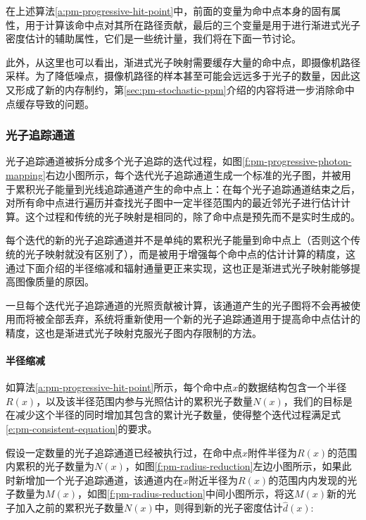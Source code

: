 在上述算法\ref{a:pm-progressive-hit-point}中，前面的变量为命中点本身的固有属性，用于计算该命中点对其所在路径贡献，最后的三个变量是用于进行渐进式光子密度估计的辅助属性，它们是一些统计量，我们将在下面一节讨论。

此外，从这里也可以看出，渐进式光子映射需要缓存大量的命中点，即摄像机路径采样。为了降低噪点，摄像机路径的样本甚至可能会远远多于光子的数量，因此这又形成了新的内存制约，第\ref{sec:pm-stochastic-ppm}介绍的内容将进一步消除命中点缓存导致的问题。






\subsubsection{光子追踪通道}
光子追踪通道被拆分成多个光子追踪的迭代过程，如图\ref{f:pm-progressive-photon-mapping}右边小图所示，每个迭代光子追踪通道生成一个标准的光子图，并被用于累积光子能量到光线追踪通道产生的命中点上：在每个光子追踪通道结束之后，对所有命中点进行遍历并查找光子图中一定半径范围内的最近邻光子进行估计计算。这个过程和传统的光子映射是相同的，除了命中点是预先而不是实时生成的。

每个迭代的新的光子追踪通道并不是单纯的累积光子能量到命中点上（否则这个传统的光子映射就没有区别了），而是被用于增强每个命中点的估计计算的精度，这通过下面介绍的半径缩减和辐射通量更正来实现，这也正是渐进式光子映射能够提高图像质量的原因。

一旦每个迭代光子追踪通道的光照贡献被计算，该通道产生的光子图将不会再被使用而将被全部丢弃，系统将重新使用一个新的光子追踪通道用于提高命中点估计的精度，这也是渐进式光子映射克服光子图内存限制的方法。





\paragraph{半径缩减}
如算法\ref{a:pm-progressive-hit-point}所示，每个命中点$x$的数据结构包含一个半径$R(x)$，以及该半径范围内参与光照估计的累积光子数量$N(x)$，我们的目标是在减少这个半径的同时增加其包含的累计光子数量，使得整个迭代过程满足式\ref{e:pm-consistent-equation}的要求。

假设一定数量的光子追踪通道已经被执行过，在命中点$x$附件半径为$R(x)$的范围内累积的光子数量为$N(x)$，如图\ref{f:pm-radius-reduction}左边小图所示，如果此时新增加一个光子追踪通道，该通道内在$x$附近半径为$R(x)$的范围内内发现的光子数量为$M(x)$，如图\ref{f:pm-radius-reduction}中间小图所示，将这$M(x)$新的光子加入之前的累积光子数量$N(x)$中，则得到新的光子密度估计$\hat{d}(x)$:

